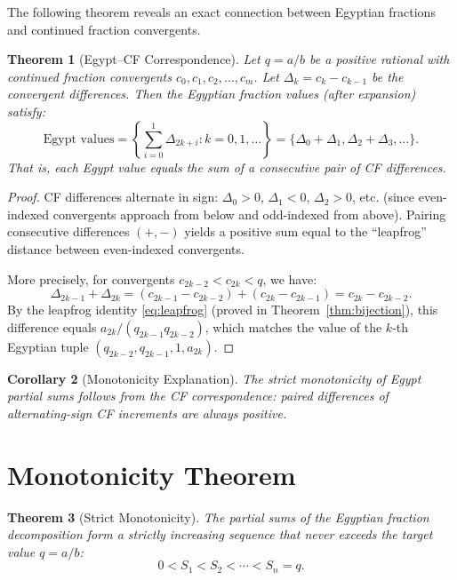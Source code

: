 \documentclass[11pt]{article}
\newtheorem{theorem}{Theorem}
\newtheorem{corollary}[theorem]{Corollary}
\theoremstyle{definition}
\theoremstyle{remark}
\begin{document}
The following theorem reveals an exact connection between Egyptian fractions and
continued fraction convergents.

\begin{theorem}[Egypt--CF Correspondence]\label{thm:cf}
Let $q = a/b$ be a positive rational with continued fraction convergents
$c_0, c_1, c_2, \ldots, c_m$. Let $\Delta_k = c_k - c_{k-1}$ be the convergent
differences. Then the Egyptian fraction values (after expansion) satisfy:
\[
\text{Egypt values} = \left\{\sum_{i=0}^{1} \Delta_{2k+i} : k = 0, 1, \ldots\right\}
= \{\Delta_0 + \Delta_1, \Delta_2 + \Delta_3, \ldots\}.
\]
That is, each Egypt value equals the sum of a consecutive \emph{pair} of CF differences.
\end{theorem}

\begin{proof}
CF differences alternate in sign: $\Delta_0 > 0$, $\Delta_1 < 0$, $\Delta_2 > 0$, etc.
(since even-indexed convergents approach from below and odd-indexed from above).
Pairing consecutive differences $(+, -)$ yields a positive sum equal to the
``leapfrog'' distance between even-indexed convergents.

More precisely, for convergents $c_{2k-2} < c_{2k} < q$, we have:
\[
\Delta_{2k-1} + \Delta_{2k} = (c_{2k-1} - c_{2k-2}) + (c_{2k} - c_{2k-1}) = c_{2k} - c_{2k-2}.
\]
By the leapfrog identity \eqref{eq:leapfrog} (proved in Theorem~\ref{thm:bijection}),
this difference equals $a_{2k}/(q_{2k-1} q_{2k-2})$, which matches the value of the
$k$-th Egyptian tuple $(q_{2k-2}, q_{2k-1}, 1, a_{2k})$.
\end{proof}

\begin{corollary}[Monotonicity Explanation]
The strict monotonicity of Egypt partial sums follows from the CF correspondence:
paired differences of alternating-sign CF increments are always positive.
\end{corollary}

\section{Monotonicity Theorem}

\begin{theorem}[Strict Monotonicity]\label{thm:mono}
The partial sums of the Egyptian fraction decomposition form a strictly increasing
sequence that never exceeds the target value $q = a/b$:
\[
0 < S_1 < S_2 < \cdots < S_n = q.
\]
\end{theorem}
\end{document}
